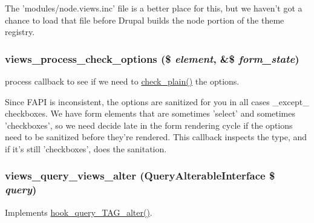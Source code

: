 The 'modules/node.views.inc' file is a better place for this, but we haven't got a chance to load that file before Drupal builds the node portion of the theme registry. \hypertarget{views_8module_a15e88bdb192b9928200f4304f010acb1}{
\subsubsection[{views\_\-process\_\-check\_\-options}]{\setlength{\rightskip}{0pt plus 5cm}views\_\-process\_\-check\_\-options (\$ {\em element}, \/  \&\$ {\em form\_\-state})}}
\label{views_8module_a15e88bdb192b9928200f4304f010acb1}
process callback to see if we need to \hyperlink{group__sanitization_ga76fc67a30fd8d75ddd80565e6e65a13d}{check\_\-plain()} the options.

Since FAPI is inconsistent, the options are sanitized for you in all cases \_\-except\_\- checkboxes. We have form elements that are sometimes 'select' and sometimes 'checkboxes', so we need decide late in the form rendering cycle if the options need to be sanitized before they're rendered. This callback inspects the type, and if it's still 'checkboxes', does the sanitation. \hypertarget{views_8module_a621a7deea033fadbb8de49ef7795a8b7}{
\subsubsection[{views\_\-query\_\-views\_\-alter}]{\setlength{\rightskip}{0pt plus 5cm}views\_\-query\_\-views\_\-alter ({\bf QueryAlterableInterface} \$ {\em query})}}
\label{views_8module_a621a7deea033fadbb8de49ef7795a8b7}
Implements \hyperlink{group__hooks_ga12527037deeb76adcab1000e984fdfce}{hook\_\-query\_\-TAG\_\-alter()}.

